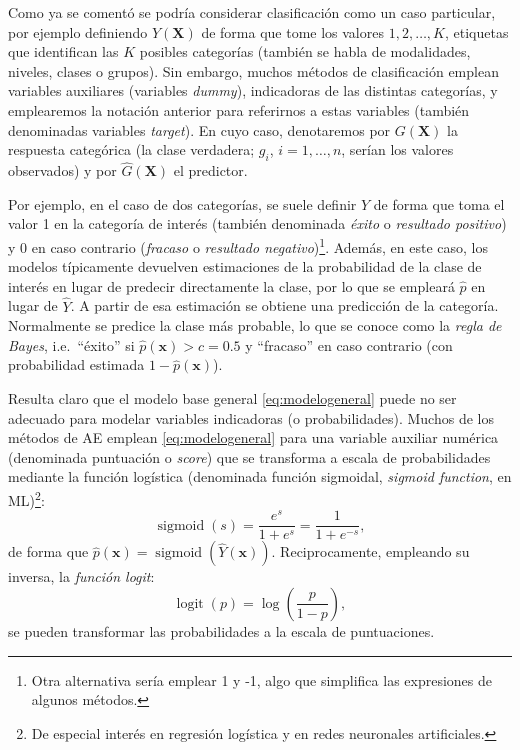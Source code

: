 \documentclass[
  spanish,
]{book}
\theoremstyle{break}
\theoremstyle{definition}
\theoremstyle{definition}
\theoremstyle{definition}
\theoremstyle{definition}
\theoremstyle{remark}
\begin{document}
Como ya se comentó se podría considerar clasificación como un caso particular, por ejemplo definiendo \(Y\left(\mathbf{X} \right)\) de forma que tome los valores \(1, 2, \ldots, K\), etiquetas que identifican las \(K\) posibles categorías (también se habla de modalidades, niveles, clases o grupos).
Sin embargo, muchos métodos de clasificación emplean variables auxiliares (variables \emph{dummy}), indicadoras de las distintas categorías, y emplearemos la notación anterior para referirnos a estas variables (también denominadas variables \emph{target}). En cuyo caso, denotaremos por \(G \left(\mathbf{X} \right)\) la respuesta categórica (la clase verdadera; \(g_i\), \(i =1, \ldots, n\), serían los valores observados) y por \(\hat G \left(\mathbf{X} \right)\) el predictor.

Por ejemplo, en el caso de dos categorías, se suele definir \(Y\) de forma que toma el valor 1 en la categoría de interés (también denominada \emph{éxito} o \emph{resultado positivo}) y 0 en caso contrario (\emph{fracaso} o \emph{resultado negativo})\footnote{Otra alternativa sería emplear 1 y -1, algo que simplifica las expresiones de algunos métodos.}.
Además, en este caso, los modelos típicamente devuelven estimaciones de la probabilidad de la clase de interés en lugar de predecir directamente la clase, por lo que se empleará \(\hat p\) en lugar de \(\hat Y\).
A partir de esa estimación se obtiene una predicción de la categoría.
Normalmente se predice la clase más probable, lo que se conoce como la \emph{regla de Bayes}, i.e.~``éxito'' si \(\hat p(\mathbf{x}) > c = 0.5\) y ``fracaso'' en caso contrario (con probabilidad estimada \(1 - \hat p(\mathbf{x})\)).

Resulta claro que el modelo base general \eqref{eq:modelogeneral} puede no ser adecuado para modelar variables indicadoras (o probabilidades).
Muchos de los métodos de AE emplean \eqref{eq:modelogeneral} para una variable auxiliar numérica (denominada puntuación o \emph{score}) que se transforma a escala de probabilidades mediante la función logística (denominada función sigmoidal, \emph{sigmoid function}, en ML)\footnote{De especial interés en regresión logística y en redes neuronales artificiales.}:
\[\operatorname{sigmoid}(s) = \frac{e^s}{1 + e^s}= \frac{1}{1 + e^{-s}},\]
de forma que \(\hat p(\mathbf{x}) = \operatorname{sigmoid}(\hat Y(\mathbf{x}))\).
Reciprocamente, empleando su inversa, la \emph{función logit}:
\[\operatorname{logit}(p)=\log\left( \frac{p}{1-p} \right),\]
se pueden transformar las probabilidades a la escala de puntuaciones.
\end{document}
